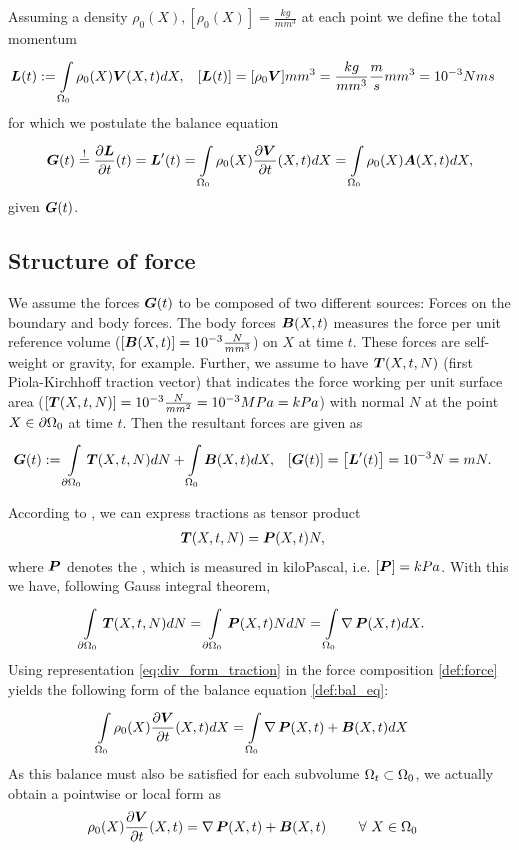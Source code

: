 Assuming a density $\rho_0(X), \left[\rho_0(X)\right] = \frac{kg}{mm^3}$ at each point we define the total momentum
\begin{align*}
 	\boldsymbol{L}(t) &:= \int\limits_{\Omega_0}^{} \rho_0(X)\boldsymbol{V}(X,t) dX, & [\boldsymbol{L}(t)] &= [\rho_0\boldsymbol{V}]mm^3 = \frac{kg}{mm^3}\frac{m}{s}mm^3 = 10^{-3}Nms
\end{align*} 
for which we postulate the balance equation
\begin{align}
	\boldsymbol{G}(t) \stackrel{!}{=} \frac{\partial \boldsymbol{L}}{\partial t}(t) = \boldsymbol{L}'(t) = \int\limits_{\Omega_0}^{} \rho_0(X)\frac{\partial \boldsymbol{V}}{\partial t}(X,t) dX = \int\limits_{\Omega_0}^{} \rho_0(X)\boldsymbol{A}(X,t) dX,\label{def:bal_eq}
\end{align}
given  $\boldsymbol{G}(t)$.

\subsection{Structure of force}
We assume the forces $\boldsymbol{G}(t)$ to be composed of two different sources: Forces on the boundary and body forces.
The body forces $\boldsymbol{B}(X,t)$ measures the force per unit reference volume ($\left[\boldsymbol{B}(X,t)\right] = 10^{-3}\frac{N}{mm^3}$) on $X$ at time $t$.
These forces are self-weight or gravity, for example.
Further, we assume to have  $\boldsymbol{T}(X,t,N)$ (first Piola-Kirchhoff traction vector) that indicates the force working per unit
surface area ($[\boldsymbol{T}(X,t,N)] = 10^{-3}\frac{N}{mm^2} = 10^{-3}MPa = kPa$) with normal $N$ at the point $X\in\partial\Omega_0$ at time $t$.
Then the resultant forces are given as
\begin{align}
	\boldsymbol{G}(t) &:= \int\limits_{\partial\Omega_0}^{} \boldsymbol{T}(X,t,N)dN + \int\limits_{\Omega_0}^{} \boldsymbol{B}(X,t)dX, & \left[\boldsymbol{G}(t)\right] = \left[\boldsymbol{L}'(t)\right] &= 10^{-3}N = mN. \label{def:force}
\end{align}

According to , we can express tractions as tensor product
\begin{align}
	\boldsymbol{T}(X,t,N) &= \boldsymbol{P}(X,t)N,\label{def:T}
\end{align}
where $\boldsymbol{P}$ denotes the , which is measured in kiloPascal, i.e. $[\boldsymbol{P}] = kPa$.
With this we have, following Gauss integral theorem,
\begin{align}
	\int\limits_{\partial\Omega_0}^{} \boldsymbol{T}(X,t,N)dN &= \int\limits_{\partial\Omega_0}^{} \boldsymbol{P}(X,t)NdN = \int\limits_{\Omega_0}^{} \operatorname{\nabla}\boldsymbol{P}(X,t)dX.\label{eq:div_form_traction}
\end{align}
Using representation \eqref{eq:div_form_traction} in the force composition 
\eqref{def:force} yields the following form of the balance equation \eqref{def:bal_eq}:
\begin{align}
	\int\limits_{\Omega_0}^{} \rho_0(X)\frac{\partial \boldsymbol{V}}{\partial t}(X,t) dX &= \int\limits_{\Omega_0}^{} \operatorname{\nabla}\boldsymbol{P}(X,t) + \boldsymbol{B}(X,t) dX
\end{align}
As this balance must also be satisfied for each subvolume $\Omega_t\subset\Omega_0$, we actually obtain a pointwise or local form as
\begin{align}
	\rho_0(X)\frac{\partial \boldsymbol{V}}{\partial t}(X,t) &= \operatorname{\nabla}\boldsymbol{P}(X,t) + \boldsymbol{B}(X,t) \qquad ~\forall~ X\in\Omega_0\label{def:maineq}
\end{align}

